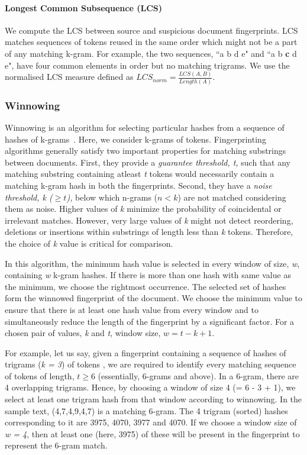 \documentclass[11pt]{article}
\begin{document}
\paragraph{Longest Common Subsequence (LCS)} We compute the LCS between source and suspicious document fingerprints. LCS matches sequences of tokens reused in the same order which might not be a part of any matching k-gram. For example, the two sequences, ``a b d e" and ``a b \textbf{c} d e", have four common elements in order but no matching trigrams. We use the normalised LCS measure defined as {\small ${LCS}_{norm} = \frac{\displaystyle {LCS(A, B)}}{\displaystyle {Length(A)}}$}.  

\subsubsection*{Winnowing} 
Winnowing is an algorithm for selecting particular hashes from a sequence of  hashes of k-grams~\cite{sch:03}. Here, we consider k-grams of tokens. Fingerprinting algorithms generally satisfy two important properties for matching substrings between documents. First, they provide a {\em  guarantee threshold, t,} such that any matching substring containing atleast {\em  t} tokens would necessarily contain a matching k-gram hash in both the fingerprints.
 Second, they have a {\em  noise threshold, k ($\geq t$),} below which n-grams ($n < k$) are not matched considering them as noise. Higher values of {\em  k} minimize the probability of coincidental or irrelevant matches. However, very large values of {\em  k} might not detect reordering, deletions or insertions within substrings of length less than {\em  k} tokens. Therefore, the choice of {\em  k } value is critical for comparison.
	
	In this algorithm, the minimum hash value is selected in every window of size, {\em  w}, containing {\em  w} k-gram hashes. If there is more than one hash with same value as the minimum, we choose the rightmost occurrence. The selected set of hashes form the winnowed fingerprint of the document. We choose the minimum value to ensure that there is at least one hash value from every window and to simultaneously reduce the length of the fingerprint by a significant factor. For a chosen pair of values, {\em  k} and {\em  t}, window size, $w  = t - k + 1$.
	
	 For example, let us say, given a fingerprint containing a sequence of hashes of trigrams ({\em k = 3}) of tokens , we are required to identify every matching sequence of tokens of length, $t \geq 6$ (essentially, 6-grams and above). In a 6-gram, there are 4 overlapping trigrams. Hence, by choosing a window of size 4 (= 6 - 3 + 1), we select at least one trigram hash  from that window according to winnowing. In the sample text, (4,7,4,9,4,7) is a matching 6-gram. The 4 trigram (sorted) hashes corresponding to it are 3975, 4070, 3977 and 4070. If we choose a window size of {\em w = 4}, then at least one (here, 3975) of these will be present in the fingerprint to represent the 6-gram match. 
	 
\end{document}
